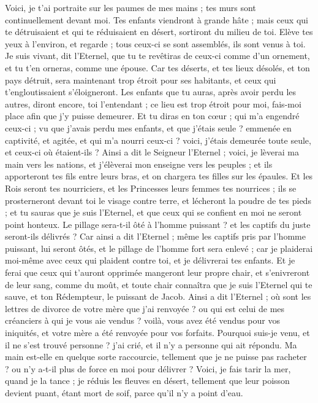 \begin{multicols}{2}
Voici, je t'ai portraite sur les paumes de mes mains ; tes murs sont continuellement devant moi.
Tes enfants viendront à grande hâte ; mais ceux qui te détruisaient et qui te réduisaient en désert, sortiront du milieu de toi.
Elève tes yeux à l'environ, et regarde ; tous ceux-ci se sont assemblés, ils sont venus à toi. Je suis vivant, dit l'Eternel, que tu te revêtiras de ceux-ci comme d'un ornement, et tu t'en orneras, comme une épouse.
Car tes déserts, et tes lieux désolés, et ton pays détruit, sera maintenant trop étroit pour ses habitants, et ceux qui t'engloutissaient s'éloigneront.
Les enfants que tu auras, après avoir perdu les autres, diront encore, toi l'entendant ; ce lieu est trop étroit pour moi, fais-moi place afin que j'y puisse demeurer.
Et tu diras en ton cœur ; qui m'a engendré ceux-ci ; vu que j'avais perdu mes enfants, et que j'étais seule ? emmenée en captivité, et agitée, et qui m'a nourri ceux-ci ? voici, j'étais demeurée toute seule, et ceux-ci où étaient-ils ?
Ainsi a dit le Seigneur l'Eternel ; voici, je lèverai ma main vers les nations, et j'élèverai mon enseigne vers les peuples ; et ils apporteront tes fils entre leurs bras, et on chargera tes filles sur les épaules.
Et les Rois seront tes nourriciers, et les Princesses leurs femmes tes nourrices ; ils se prosterneront devant toi le visage contre terre, et lécheront la poudre de tes pieds ; et tu sauras que je suis l'Eternel, et que ceux qui se confient en moi ne seront point honteux.
Le pillage sera-t-il ôté à l'homme puissant ? et les captifs du juste seront-ils délivrés ?
Car ainsi a dit l'Eternel ; même les captifs pris par l'homme puissant, lui seront ôtés, et le pillage de l'homme fort sera enlevé ; car je plaiderai moi-même avec ceux qui plaident contre toi, et je délivrerai tes enfants.
Et je ferai que ceux qui t'auront opprimée mangeront leur propre chair, et s'enivreront de leur sang, comme du moût, et toute chair connaîtra que je suis l'Eternel qui te sauve, et ton Rédempteur, le puissant de Jacob.
\VerseOne{}Ainsi a dit l'Eternel ; où sont les lettres de divorce de votre mère que j'ai renvoyée ? ou qui est celui de mes créanciers à qui je vous aie vendus ? voilà, vous avez été vendus pour vos iniquités, et votre mère a été renvoyée pour vos forfaits.
Pourquoi suis-je venu, et il ne s'est trouvé personne ? j'ai crié, et il n'y a personne qui ait répondu. Ma main est-elle en quelque sorte raccourcie, tellement que je ne puisse pas racheter ? ou n'y a-t-il plus de force en moi pour délivrer ? Voici, je fais tarir la mer, quand je la tance ; je réduis les fleuves en désert, tellement que leur poisson devient puant, étant mort de soif, parce qu'il n'y a point d'eau.

\end{multicols}
